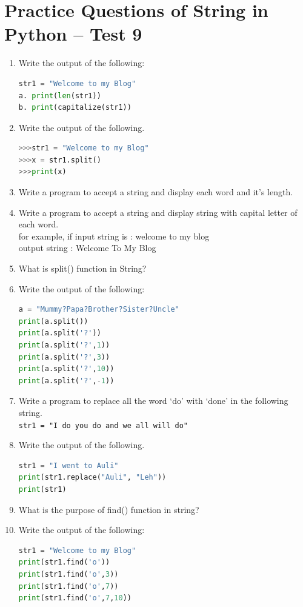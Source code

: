 \documentclass[12pt,a4paper]{article}
\begin{document}
\section{Practice Questions of String in Python -- Test 9}

\begin{enumerate}[label=\textbf{Q\arabic*.}]

\item Write the output of the following:
\begin{lstlisting}[language=Python]
str1 = "Welcome to my Blog"
a. print(len(str1))
b. print(capitalize(str1))
\end{lstlisting}

\item Write the output of the following.
\begin{lstlisting}[language=Python]
>>>str1 = "Welcome to my Blog"
>>>x = str1.split()
>>>print(x)
\end{lstlisting}

\item Write a program to accept a string and display each word and it's length.

\item Write a program to accept a string and display string with capital letter of each word. \\
for example, if input string is : welcome to my blog \\
output string : Welcome To My Blog

\item What is split() function in String?

\item Write the output of the following:
\begin{lstlisting}[language=Python]
a = "Mummy?Papa?Brother?Sister?Uncle"
print(a.split())
print(a.split('?'))
print(a.split('?',1))
print(a.split('?',3))
print(a.split('?',10))
print(a.split('?',-1))
\end{lstlisting}

\item Write a program to replace all the word `do' with `done' in the following string. \\
\texttt{str1 = "I do you do and we all will do"}

\item Write the output of the following.
\begin{lstlisting}[language=Python]
str1 = "I went to Auli"
print(str1.replace("Auli", "Leh"))
print(str1)
\end{lstlisting}

\item What is the purpose of find() function in string?

\item Write the output of the following:
\begin{lstlisting}[language=Python]
str1 = "Welcome to my Blog"
print(str1.find('o'))
print(str1.find('o',3))
print(str1.find('o',7))
print(str1.find('o',7,10))
\end{lstlisting}

\end{enumerate}
\end{document}
